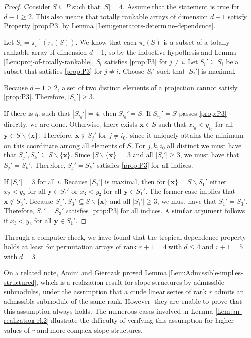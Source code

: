 \documentclass{amsart}
\begin{document}
	\begin{proof}
		Consider $S \subseteq P$ such that $|S| = 4$. Assume that the statement is true for $d-1 \geq 2$. This also means that totally rankable arrays of dimension $d-1$ satisfy Property \ref{prop:P3} by Lemma \ref{Lem:generators-determine-dependence}.
		
		Let $S_i = \pi_i^{-1}(\pi_i(S))$. We know that each $\pi_i(S)$ is a subset of a totally rankable array of dimension $d-1$, so by the inductive hypothesis and Lemma \ref{Lem:proj-of-totally-rankable}, $S_i$ satisfies \ref{prop:P3} for $j \neq i$. Let $S_i' \subseteq S_i$ be a subset that satisfies \ref{prop:P3} for $j \neq i$. Choose $S_i'$ such that $|S_i'|$ is maximal. 
		
		Because $d-1 \geq 2$, a set of two distinct elements of a projection cannot satisfy \ref{prop:P3}. Therefore, $|S_i'| \geq 3$.
		
		If there is $i_0$ such that $|S_{i_0}'| = 4$, then $S_{i_0}' = S$. If $S_{i_0}' = S$ passes \ref{prop:P3} directly, we are done. Otherwise, there exists $\mathbf{x} \in S$ such that $x_{i_{0}} < y_{i_0}$ for all $\mathbf{y} \in S \backslash \{ \mathbf{x} \}$. Therefore, $\mathbf{x} \not \in S_j'$ for $j \neq i_0$, since it uniquely attains the minimum on this coordinate among all elements of $S$. For $j, k, i_0$ all distinct we must have that $S_j', S_k' \subseteq S \backslash \{ \mathbf{x} \}$. Since $|S \backslash \{ \mathbf{x} \}| = 3$ and all $|S_i'| \geq 3$, we must have that $S_j' = S_k'$. Therefore, $S_j' = S_k'$ satisfies \ref{prop:P3} for all indices.
		
		If $|S_i'| = 3$ for all $i$. Because $|S_1'|$ is maximal, then for $\{ \mathbf{x} \} = S \backslash S_1'$ either $x_2 < y_2$ for all $\mathbf{y} \in S_1'$ or $x_3 < y_3$ for all $\mathbf{y} \in S_1'$. The former case implies that $\mathbf{x} \not \in S_3'$. Because $S_1', S_3' \subseteq S \backslash \{ \mathbf{x} \}$ and all $|S_i'| \geq 3$, we must have that $S_1' = S_3'$. Therefore, $S_1' = S_3'$ satisfies \ref{prop:P3} for all indices. A similar argument follows if $x_3 < y_3$ for all $\mathbf{y} \in S_1'$.
	\end{proof}
	
	Through a computer check, we have found that the tropical dependence property holds at least for permutation arrays of rank $r+1=4$ with $d \leq 4$ and $r+1 = 5$ with $d=3$.
	
	On a related note, Amini and Gierczak proved Lemma \ref{Lem:Admissible-implies-structured}, which is a realization result for slope structures by admissible submodules, under the assumption that a crude linear series of rank $r$ admits an admissible submodule of the same rank. However, they are unable to prove that this assumption always holds. The numerous cases involved in Lemma \ref{Lem:bn-realization-rk2} illustrate the difficulty of verifying this assumption for higher values of $r$ and more complex slope structures.
	
\end{document}
